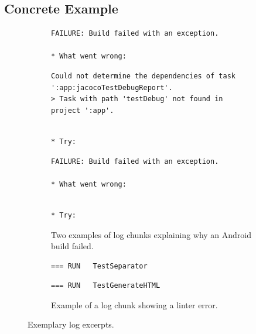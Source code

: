\subsection{Concrete Example}
\label{sec:crt-example}

\lstset{escapeinside=//}
\begin{figure}[tbp]
  \centering
\begin{subfigure}[tbp]{\columnwidth}
  \begin{lstlisting}[breaklines=true,frame=tlr]
FAILURE: Build failed with an exception.

* What went wrong:
  \end{lstlisting}
  \vspace{-\baselineskip}
  \begin{lstlisting}[backgroundcolor=\color{Cerulean!60},breaklines=true,frame=rl]
Could not determine the dependencies of task ':app:jacocoTestDebugReport'.
> Task with path 'testDebug' not found in project ':app'.
  \end{lstlisting}
  \vspace{-\baselineskip}
  \begin{lstlisting}[breaklines=true,frame=blr]

* Try:
  \end{lstlisting}
\end{subfigure}\hspace{\fill}
\begin{subfigure}[tbp]{\columnwidth}
  \centering
  \begin{lstlisting}[breaklines=true,frame=tlr]
FAILURE: Build failed with an exception.

* What went wrong:
  \end{lstlisting}
  \vspace{-\baselineskip}
  
  \vspace{-\baselineskip}
  \begin{lstlisting}[breaklines=true,frame=blr]

* Try:
  \end{lstlisting}
    \caption{Two examples of log chunks explaining why an Android
  build failed.}
  \label{lst:chunk-example}
\end{subfigure}

\begin{subfigure}[tbp]{\columnwidth}
  \begin{lstlisting}[breaklines=true,frame=tlr]
=== RUN   TestSeparator
  \end{lstlisting}
  \vspace{-\baselineskip}
  
  \vspace{-\baselineskip}
  \begin{lstlisting}[breaklines=true,frame=blr]
=== RUN   TestGenerateHTML
  \end{lstlisting}
  \caption{Example of a log chunk showing a linter error.}
  \label{lst:chunk-example-3}
\end{subfigure}

\caption{Exemplary log excerpts.}
\label{lst:logexamples}
\end{figure}

